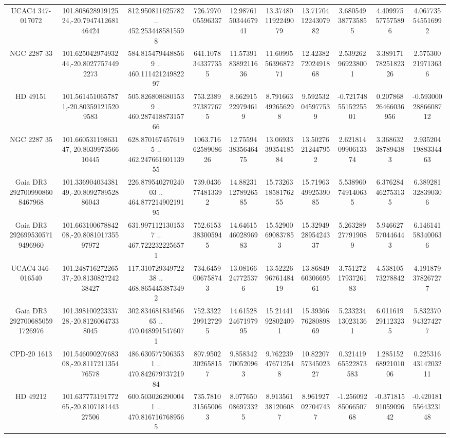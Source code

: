 \begin{table}
\begin{tabular}{cccccccccc}
UCAC4 347-017072 & 101.80862891912524,-20.794741268146424 & 812.950811625782 .. 452.2534485815598 & 726.797005596337 & 12.987615034467941 & 13.374801192249079 & 13.717041224307982 & 3.680549387735855 & 4.409975577575896 & 4.067735545516992 \\
NGC  2287    33 & 101.62504297493244,-20.80277574492273 & 584.8154794488569 .. 460.11142124982297 & 641.1078343377355 & 11.573918389211636 & 11.609955639687271 & 12.423827202491868 & 2.539262969238001 & 3.3891717825182326 & 2.575300219713636 \\
HD  49151 & 101.5614510657871,-20.803591215209583 & 505.8268086801539 .. 460.28741887315766 & 753.2389273877675 & 8.662915229794619 & 8.791663492656298 & 9.592532045977539 & -0.7217485515225501 & 0.20786826466036956 & -0.5930002886608712 \\
NGC  2287    35 & 101.66053119863147,-20.803997356610445 & 628.8701674576195 .. 462.24766160113955 & 1063.7166258908626 & 12.755943835646475 & 13.069333935418584 & 13.50276212447952 & 2.6218140990613374 & 3.368632387894383 & 2.9352041988334463 \\
Gaia DR3 2927009908608467968 & 101.33690403438149,-20.809278952886043 & 226.87954027024003 .. 464.87721490219195 & 739.0436774813392 & 14.882311278926585 & 15.732631858176255 & 15.719634992539085 & 5.538960749140635 & 6.376284462753135 & 6.389281328390306 \\
Gaia DR3 2926995305719496960 & 101.66310067884208,-20.808101735597972 & 631.9971121301537 .. 467.7222322256571 & 752.6153383005945 & 14.646154602896983 & 15.52900690837853 & 15.329492895424337 & 5.263289277919089 & 5.946627570446443 & 6.146141583400636 \\
UCAC4 346-016540 & 101.24871627226537,-20.813082724238427 & 117.31072934972238 .. 468.8654453873492 & 734.6459006758743 & 13.08166247725376 & 13.522269676148419 & 13.868496030669561 & 3.7512721793726183 & 4.53810573278842 & 4.191879378267277 \\
Gaia DR3 2927006850591726976 & 101.39810022333728,-20.81260647338045 & 302.83468183456665 .. 470.0489915476071 & 752.3322299127295 & 14.615282467197995 & 15.21441928024091 & 15.393667628089869 & 5.233234130231361 & 6.011619291123235 & 5.832370943274277 \\
CPD-20  1613 & 101.54609020768308,-20.811721135476578 & 486.6305775063531 .. 470.84267973721984 & 807.9502302658157 & 9.858342700520963 & 9.762239476712548 & 10.822075734502327 & 0.32141965522873583 & 1.2851526892101006 & 0.2253164314203211 \\
HD  49212 & 101.63777319177265,-20.810718144327506 & 600.5030262900041 .. 470.8167167689565 & 735.7810315650063 & 8.077650086973325 & 8.913561381206087 & 8.961927027047437 & -1.2560928506650768 & -0.3718159105909642 & -0.4201815564323148 \\

\end{tabular}
\end{table}
